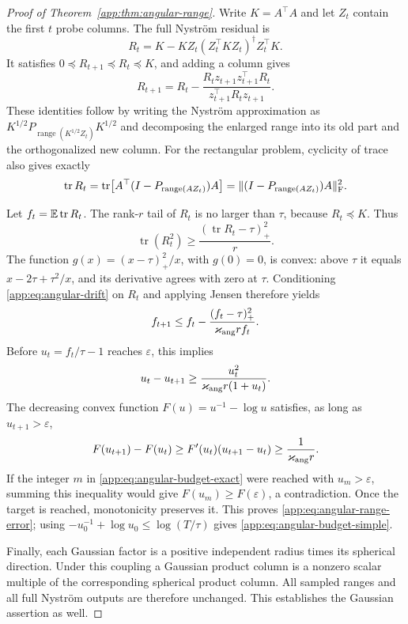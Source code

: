 \documentclass[11pt,a4paper]{article}
\theoremstyle{definition}\newtheorem{definition}[theorem]{Definition}
\theoremstyle{remark}\newtheorem{remark}[theorem]{Remark}
\numberwithin{equation}{section}
\newcommand{\norm}[1]{\lVert#1\rVert}\newcommand{\ip}[2]{\langle#1,#2\rangle}
\DeclareMathOperator{\tr}{tr}\DeclareMathOperator{\rank}{rank}
\DeclareMathOperator{\range}{range}\DeclareMathOperator{\diag}{diag}
\begin{document}
\begin{proof}[Proof of Theorem~\ref{app:thm:angular-range}]
Write $K=A^\top A$ and let $Z_t$ contain the first $t$ probe columns.
The full Nystr\"om residual is
\[
 R_t=K-KZ_t(Z_t^\top KZ_t)^\dagger Z_t^\top K.
\]
It satisfies $0\preceq R_{t+1}\preceq R_t\preceq K$, and adding a
column gives
\[
 R_{t+1}=R_t-
  \frac{R_tz_{t+1}z_{t+1}^\top R_t}{z_{t+1}^\top R_tz_{t+1}}.
\]
These identities follow by writing the Nystr\"om approximation as
$K^{1/2}P_{\range(K^{1/2}Z_t)}K^{1/2}$ and decomposing the enlarged
range into its old part and the orthogonalized new column.
For the rectangular problem, cyclicity of trace also gives exactly
\[
 \tr R_t
 =\tr\bigl[A^\top(I-P_{\range(AZ_t)})A\bigr]
 =\norm{(I-P_{\range(AZ_t)})A}_\F^2.
\]

Let $f_t=\E\tr R_t$. The rank-$r$ tail of $R_t$ is no larger than
$\tau$, because $R_t\preceq K$. Thus
\[
 \tr(R_t^2)\ge\frac{(\tr R_t-\tau)_+^2}{r}.
\]
The function $g(x)=(x-\tau)_+^2/x$, with $g(0)=0$, is convex:
above $\tau$ it equals $x-2\tau+\tau^2/x$, and its derivative agrees
with zero at $\tau$. Conditioning \eqref{app:eq:angular-drift} on
$R_t$ and applying Jensen therefore yields
\[
 f_{t+1}\le f_t-\frac{(f_t-\tau)_+^2}
                              {\varkappa_{\rm ang}r f_t}.
\]
Before $u_t=f_t/\tau-1$ reaches $\varepsilon$, this implies
\[
 u_t-u_{t+1}\ge
       \frac{u_t^2}{\varkappa_{\rm ang}r(1+u_t)}.
\]
The decreasing convex function $F(u)=u^{-1}-\log u$ satisfies,
as long as $u_{t+1}>\varepsilon$,
\[
 F(u_{t+1})-F(u_t)
 \ge F'(u_t)(u_{t+1}-u_t)
 \ge\frac1{\varkappa_{\rm ang}r}.
\]
If the integer $m$ in \eqref{app:eq:angular-budget-exact} were reached
with $u_m>\varepsilon$, summing this inequality would give
$F(u_m)\ge F(\varepsilon)$, a contradiction. Once the target is
reached, monotonicity preserves it. This proves
\eqref{app:eq:angular-range-error}; using
$-u_0^{-1}+\log u_0\le\log(T/\tau)$ gives
\eqref{app:eq:angular-budget-simple}.

Finally, each Gaussian factor is a positive independent radius times
its spherical direction. Under this coupling a Gaussian product column
is a nonzero scalar multiple of the corresponding spherical product
column. All sampled ranges and all full Nystr\"om outputs are therefore
unchanged. This establishes the Gaussian assertion as well.
\end{proof}
\end{document}
